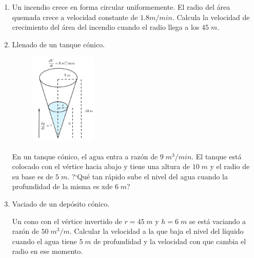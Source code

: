\begin{enumerate}
		\rightline{\textcolor{gris}{Solución: $2\; cm^2/min$}}
		
		\item Un incendio crece en forma circular uniformemente. El radio del área quemada crece a velocidad constante de $1.8 m/min$. Calcula la velocidad de crecimiento del área del incendio cuando el radio llega a los $45\; m$.
		
		\rightline{\textcolor{gris}{Solución: $2035.75\; m^2/min$}}
	
	\vspace{4mm}
		
	\item Llenado de un tanque cónico.
		
	\begin{multicols}{2}
	\begin{figure}[H]
	\centering
	\includegraphics[width=0.3\textwidth]{imagenes/imagenes04/cono.png}
	\end{figure}
	
	En un tanque cónico, el agua entra a razón de $9\; m^3/min$. El tanque está colocado con el vértice hacia abajo y tiene una altura de $10\; m$ y el radio de su base es de $5\; m$. ?`Qué tan rápido sube el nivel del agua cuando la profundidad de la misma es xde $6\; m$?
	\end{multicols}
		
	\rightline{\textcolor{gris}{Solución: $0.32 \; m/min$}}
		
	\vspace{4mm}
	
	\item Vaciado de un depósito cónico.
	
	Un cono con el vértice invertido de $r=45\; m$ y $h=6\; m$ se está vaciando a razón de $50 \; m^3/m$. Calcular la velocidad a la que baja el nivel del líquido cuando el agua tiene $5\; m$ de profundidad y la velocidad con que cambia el radio en ese momento. 
	
	
	

\end{enumerate}
